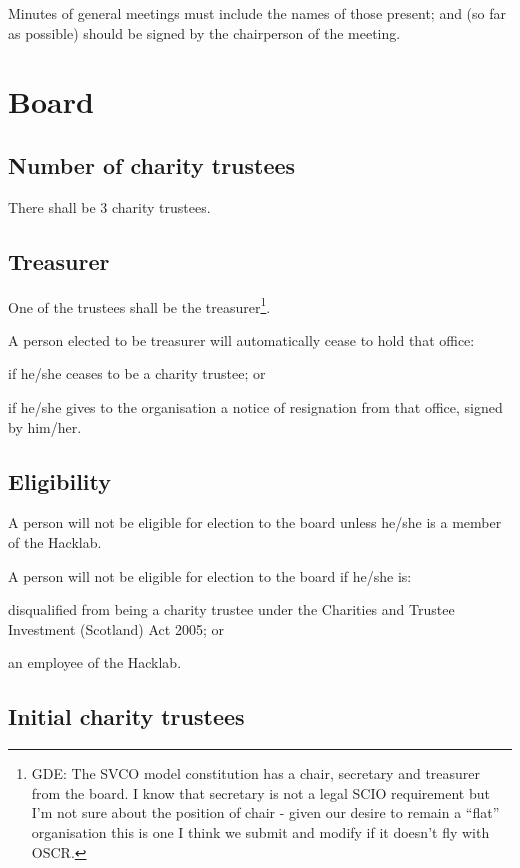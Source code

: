 \documentclass{article}
\newcommand{\charityact}{Charities and Trustee Investment (Scotland) Act 2005}
\begin{document}
\clause Minutes of general meetings must include the names of those
present; and (so far as possible) should be signed by the chairperson
of the meeting.

\section{Board}

\subsection{Number of charity trustees}

\clause There shall be 3 charity trustees.

\subsection{Treasurer}

\clause One of the trustees shall be the treasurer\footnote{GDE: The
  SVCO model constitution has a chair, secretary and treasurer from
  the board. I know that secretary is not a legal SCIO requirement but
  I'm not sure about the position of chair - given our desire to
  remain a ``flat'' organisation this is one I think we submit and
  modify if it doesn't fly with OSCR.}.

\clause A person elected to be treasurer will automatically cease to
hold that office:

\subclause if he/she ceases to be a charity trustee; or

\subclause if he/she gives to the organisation a notice of resignation
from that office, signed by him/her.

\subsection{Eligibility}

\clause A person will not be eligible for election to the board unless
he/she is a member of the Hacklab.

\clause A person will not be eligible for election to the board if
he/she is:

\subclause disqualified from being a charity trustee under the
\charityact; or

\subclause an employee of the Hacklab.

\subsection{Initial charity trustees}
\end{document}
